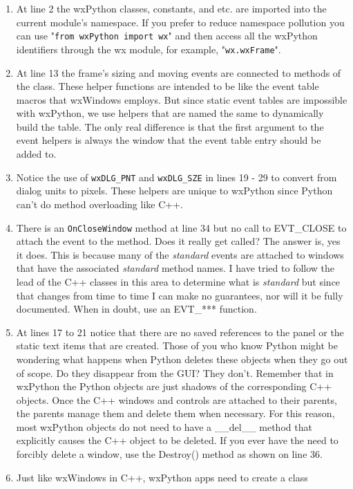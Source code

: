 
\begin{enumerate}\itemsep=11pt
\item At line 2 the wxPython classes, constants, and etc. are imported
into the current module's namespace. If you prefer to reduce
namespace pollution you can use "{\tt from wxPython import wx}" and
then access all the wxPython identifiers through the wx module, for
example, "{\tt wx.wxFrame}".
\item At line 13 the frame's sizing and moving events are connected to
methods of the class. These helper functions are intended to be like
the event table macros that wxWindows employs. But since static event
tables are impossible with wxPython, we use helpers that are named the
same to dynamically build the table. The only real difference is
that the first argument to the event helpers is always the window that
the event table entry should be added to.
\item Notice the use of {\tt wxDLG\_PNT} and {\tt wxDLG\_SZE} in lines 19
- 29 to convert from dialog units to pixels. These helpers are unique
to wxPython since Python can't do method overloading like C++.
\item There is an {\tt OnCloseWindow} method at line 34 but no call to
EVT\_CLOSE to attach the event to the method. Does it really get
called?  The answer is, yes it does. This is because many of the
{\em standard} events are attached to windows that have the associated
{\em standard} method names. I have tried to follow the lead of the
C++ classes in this area to determine what is {\em standard} but since
that changes from time to time I can make no guarantees, nor will it
be fully documented. When in doubt, use an EVT\_*** function.
\item At lines 17 to 21 notice that there are no saved references to
the panel or the static text items that are created. Those of you
who know Python might be wondering what happens when Python deletes
these objects when they go out of scope. Do they disappear from the GUI?  They
don't. Remember that in wxPython the Python objects are just shadows of the
corresponding C++ objects. Once the C++ windows and controls are
attached to their parents, the parents manage them and delete them
when necessary. For this reason, most wxPython objects do not need to
have a \_\_del\_\_ method that explicitly causes the C++ object to be
deleted. If you ever have the need to forcibly delete a window, use
the Destroy() method as shown on line 36.
\item Just like wxWindows in C++, wxPython apps need to create a class

\end{enumerate}
